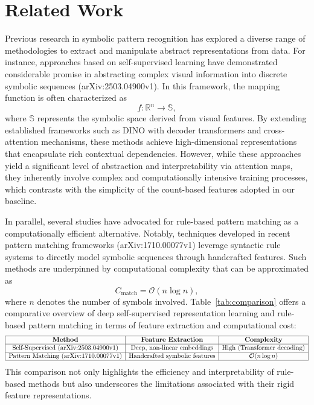 \documentclass{article}
\begin{document}
\section{Related Work}
Previous research in symbolic pattern recognition has explored a diverse range of methodologies to extract and manipulate abstract representations from data. For instance, approaches based on self-supervised learning have demonstrated considerable promise in abstracting complex visual information into discrete symbolic sequences (arXiv:2503.04900v1). In this framework, the mapping function is often characterized as 
\[
f: \mathbb{R}^{n} \rightarrow \mathbb{S},
\]
where \(\mathbb{S}\) represents the symbolic space derived from visual features. By extending established frameworks such as DINO with decoder transformers and cross-attention mechanisms, these methods achieve high-dimensional representations that encapsulate rich contextual dependencies. However, while these approaches yield a significant level of abstraction and interpretability via attention maps, they inherently involve complex and computationally intensive training processes, which contrasts with the simplicity of the count-based features adopted in our baseline.

In parallel, several studies have advocated for rule-based pattern matching as a computationally efficient alternative. Notably, techniques developed in recent pattern matching frameworks (arXiv:1710.00077v1) leverage syntactic rule systems to directly model symbolic sequences through handcrafted features. Such methods are underpinned by computational complexity that can be approximated as 
\[
C_{\text{match}} = \mathcal{O}(n \log n),
\]
where \(n\) denotes the number of symbols involved. Table~\ref{tab:comparison} offers a comparative overview of deep self-supervised representation learning and rule-based pattern matching in terms of feature extraction and computational cost:
\[
\begin{array}{|c|c|c|}
\hline
\textbf{Method} & \textbf{Feature Extraction} & \textbf{Complexity} \\
\hline
\text{Self-Supervised (arXiv:2503.04900v1)} & \text{Deep, non-linear embeddings} & \text{High (Transformer decoding)} \\
\hline
\text{Pattern Matching (arXiv:1710.00077v1)} & \text{Handcrafted symbolic features} & \mathcal{O}(n \log n) \\
\hline
\end{array}
\]
This comparison not only highlights the efficiency and interpretability of rule-based methods but also underscores the limitations associated with their rigid feature representations.
\end{document}
